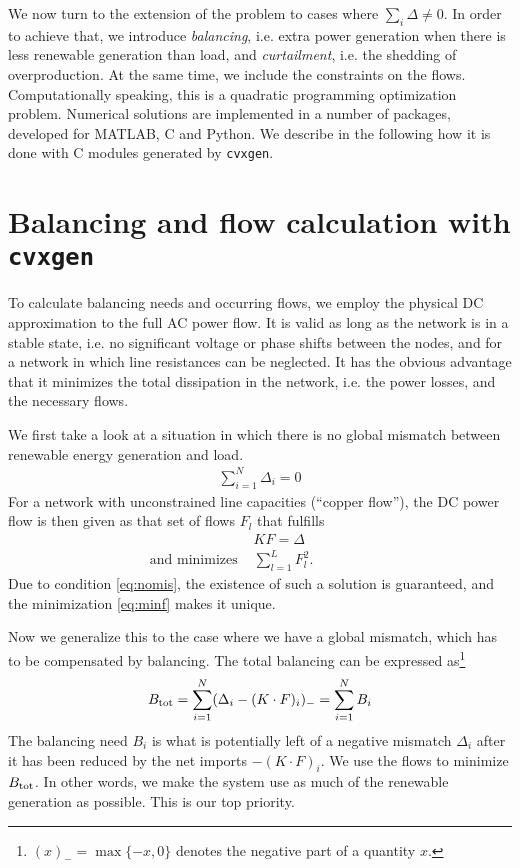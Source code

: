 \documentclass[english,twoside,a4paper,11pt]{article}
\numberwithin{equation}{section}
\begin{document}
We now turn to the extension of the problem to cases where $\sum_i
\Delta \neq 0$. In order to achieve that, we introduce {\it balancing},
i.e. extra power generation when there is less renewable generation
than load, and {\it curtailment}, i.e. the shedding of
overproduction. At the same time, we include the constraints
on the flows. Computationally speaking, this is a quadratic
programming optimization problem. Numerical solutions are implemented
in a number of packages, developed for MATLAB, C and Python. %
We describe in the following how it is done with C modules generated
by \texttt{cvxgen}.

\section{Balancing and flow calculation with \texttt{cvxgen}}

To calculate balancing needs and occurring flows, we employ the
physical DC approximation to the full AC power flow. It is valid as
long as the network is in a stable state, i.e. no significant voltage
or phase shifts between the nodes, and for a network in which line
resistances can be neglected. It has the obvious advantage that it
minimizes the total dissipation in the network, i.e. the power losses,
and the necessary flows.

We first take a look at a situation in which there is no global
mismatch between renewable energy generation and load.
\begin{align}
\sum_{i=1}^N \Delta_i =0
\label{eq:nomis}
\end{align}
For a network with unconstrained line capacities (``copper flow''),
the DC power flow is then given as that set of flows $F_l$ that
fulfills 
\begin{align}
\nonumber &KF=\Delta \qquad\qquad\quad\\
\text{ and minimizes } &\sum_{l=1}^L F_l^2.
\label{eq:minf}
\end{align}
Due to condition \eqref{eq:nomis}, the existence of such a solution is
guaranteed, and the minimization \eqref{eq:minf} makes it unique. 

Now we generalize this to the case where we have a global mismatch,
which has to be compensated by balancing. The total balancing can be
expressed as\footnote{$(x)_-=\max\{-x,0\}$ denotes the
  negative part of a quantity $x$.}
\begin{align*}
B_{\rm tot}=\sum_{i=1}^N(\Delta_i-(K\cdot F)_i)_-=\sum_{i=1}^N B_i
\end{align*}
The balancing need $B_i$ is what is potentially left of a negative
mismatch $\Delta_i$ after it has been reduced by the net imports
$-(K\cdot F)_i$. We use the flows to minimize $B_{\rm tot}$. In other
words, we make the system use as much of the 
renewable generation as possible. This is our top priority.
\end{document}
